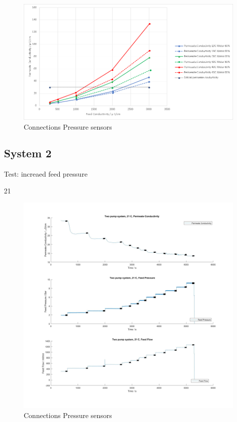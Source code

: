 \begin{figure}[H]
    \centering
    \includegraphics[width=1.1\textwidth]{PermCond}
    \caption{Connections Pressure sensors}
    \label{fig:PressConn}
\end{figure}





\subsection{System 2}

Test: increaed feed pressure

21


\begin{figure}[H]
    \centering
    \includegraphics[width=1.1\textwidth]{FeedPumpIncrease21}
    \caption{Connections Pressure sensors}
    \label{fig:PressConn}
\end{figure}


